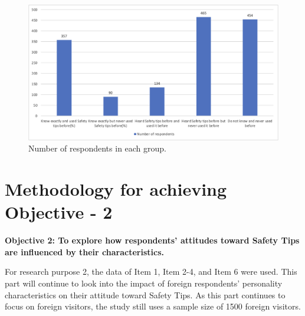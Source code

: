\begin{figure}[h]
  \includegraphics[width=\linewidth]{Figure/Figure6.jpg}
  \centering
  \caption{Number of respondents in each group. }
  \label{fig6}
\end{figure}




\section{Methodology for achieving Objective - 2 }
\textbf{Objective 2: To explore how respondents' attitudes toward Safety Tips are influenced by their characteristics. }

For research purpose 2, the data of Item 1, Item 2-4, and Item 6 were used. This part will continue to look into the impact of foreign respondents' personality characteristics on their attitude toward Safety Tips. As this part continues to focus on foreign visitors, the study still uses a sample size of 1500 foreign visitors.

